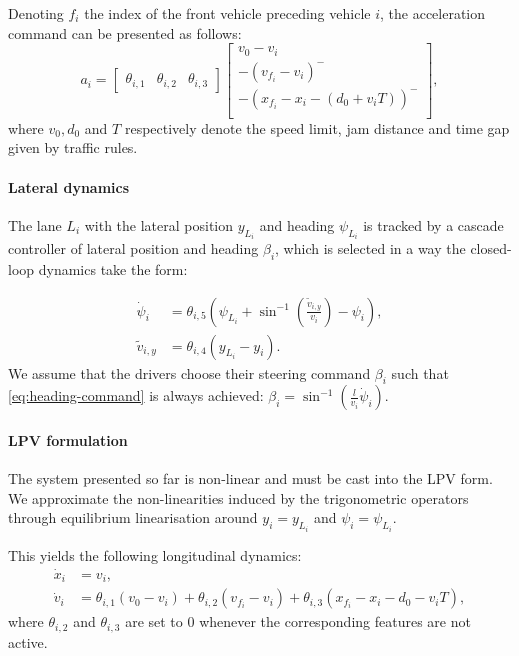 \documentclass{article}
\begin{document}
Denoting $f_i$ the index of the front vehicle preceding vehicle $i$, the acceleration command can be presented as follows:
\begin{equation*}
a_i = \begin{bmatrix}
\theta_{i,1} & \theta_{i,2} & \theta_{i,3}
\end{bmatrix} \begin{bmatrix}
v_0 - v_i \\
-(v_{f_i}-v_i)^- \\
-(x_{f_i} - x_i - (d_0 + v_iT))^- \\
\end{bmatrix},
\label{eq:theta_a}
\end{equation*}
where $v_0, d_0$ and $T$ respectively denote the speed limit, jam distance and time gap given by traffic rules.

\paragraph{Lateral dynamics}

The lane $L_i$ with the lateral position $y_{L_i}$ and heading $\psi_{L_i}$ is tracked by a cascade controller of lateral position and heading $\beta_i$, which is selected in a way the closed-loop dynamics take the form:

\begin{align}
\label{eq:heading-command}
\dot{\psi}_i &= \theta_{i,5}\left(\psi_{L_i}+\sin^{-1}\left(\frac{\tilde{v}_{i,y}}{v_i}\right)-\psi_i\right),\\
\tilde{v}_{i,y} &= \theta_{i,4} (y_{L_i}-y_i). \nonumber
\end{align}
We assume that the drivers choose their steering command $\beta_i$ such that \eqref{eq:heading-command} is always achieved: $\beta_i = \sin^{-1}(\frac{l}{v_i}\dot{\psi}_i)$.

\paragraph{LPV formulation}

The system presented so far is non-linear and must be cast into the LPV form. We approximate the non-linearities induced by the trigonometric operators through equilibrium linearisation around $y_i=y_{L_i}$ and $\psi_i=\psi_{L_i}$.

This yields the following longitudinal dynamics:
\begin{align*}
\dot{x}_i &= v_i,\\
\dot v_i &= \theta_{i,1} (v_0 - v_i) + \theta_{i,2} (v_{f_i} - v_i) + \theta_{i,3}(x_{f_i} - x_i - d_0 - v_i T),
\end{align*}
where $\theta_{i,2}$ and $\theta_{i,3}$ are set to $0$ whenever the corresponding features are not active.
\end{document}

